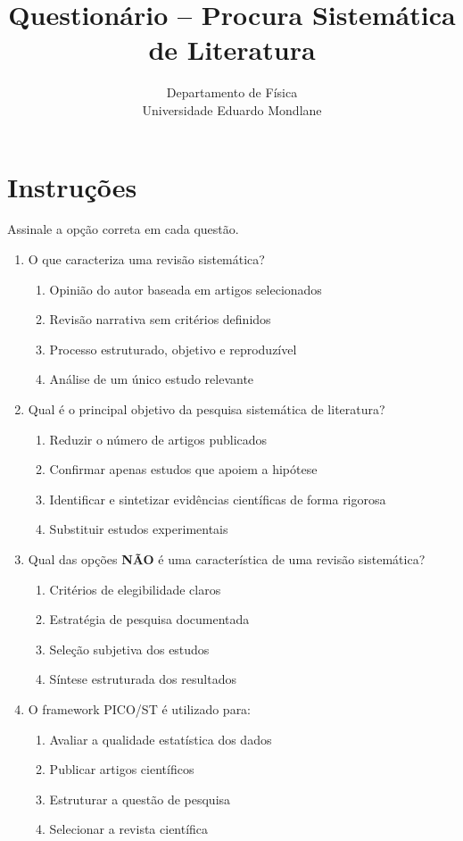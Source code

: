 \documentclass[12pt,a4paper]{article}
\title{Questionário – Procura Sistemática de Literatura}
\author{Departamento de Física \\ Universidade Eduardo Mondlane}
\date{}
\begin{document}
\maketitle

\section*{Instruções}
Assinale a opção correta em cada questão.

\begin{enumerate}[label=\textbf{\arabic*.}]

\item O que caracteriza uma revisão sistemática?
\begin{enumerate}[label=\alph*)]
    \item Opinião do autor baseada em artigos selecionados
    \item Revisão narrativa sem critérios definidos
    \item Processo estruturado, objetivo e reproduzível
    \item Análise de um único estudo relevante
\end{enumerate}

\item Qual é o principal objetivo da pesquisa sistemática de literatura?
\begin{enumerate}[label=\alph*)]
    \item Reduzir o número de artigos publicados
    \item Confirmar apenas estudos que apoiem a hipótese
    \item Identificar e sintetizar evidências científicas de forma rigorosa
    \item Substituir estudos experimentais
\end{enumerate}

\item Qual das opções \textbf{NÃO} é uma característica de uma revisão sistemática?
\begin{enumerate}[label=\alph*)]
    \item Critérios de elegibilidade claros
    \item Estratégia de pesquisa documentada
    \item Seleção subjetiva dos estudos
    \item Síntese estruturada dos resultados
\end{enumerate}

\item O framework PICO/ST é utilizado para:
\begin{enumerate}[label=\alph*)]
    \item Avaliar a qualidade estatística dos dados
    \item Publicar artigos científicos
    \item Estruturar a questão de pesquisa
    \item Selecionar a revista científica
\end{enumerate}


\end{enumerate}
\end{document}
